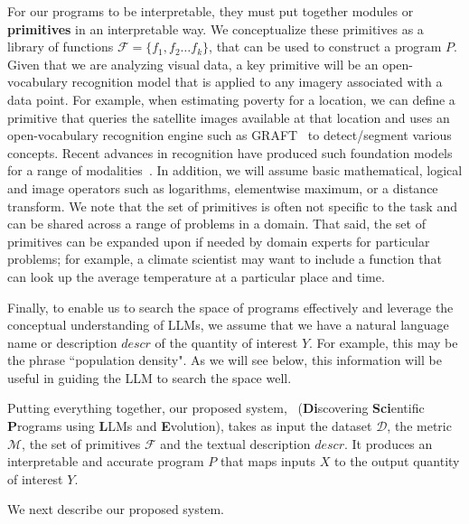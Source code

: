 For our programs to be interpretable, they must put together modules or \textbf{primitives} in an interpretable way.
We conceptualize these primitives as a library of functions $\mathcal{F} = \{f_1, f_2 \dots f_k\}$, that can be used to construct a program $P$.
Given that we are analyzing visual data, a key primitive will be an open-vocabulary recognition model that is applied to any imagery associated with a data point.
For example, when estimating poverty for a location, we can define a primitive that 
queries the satellite images available at that location and uses an open-vocabulary recognition engine such as GRAFT~\cite{mall2023graft} to detect/segment various concepts.
Recent advances in recognition have produced such foundation models for a range of modalities~\cite{mall2023graft, stevens2024bioclip}. 
In addition, we will assume basic mathematical, logical and image operators such as
logarithms, elementwise maximum, or a distance transform.
We note that the set of primitives is often not specific to the task and can be shared across a range of problems in a domain.
That said, the set of primitives can be expanded upon if needed by domain experts for particular problems; for example, a climate scientist may want to include a function that can look up the average temperature at a particular place and time.


Finally, to enable us to search the space of programs effectively and leverage the conceptual understanding of LLMs, we assume that we have a natural language name or description $descr$ of the quantity of interest $Y$. For example, this may be the phrase ``population density". 
As we will see below, this information will be useful in guiding the LLM to search the space well.

Putting everything together, our proposed system, \disciple~(\textbf{Di}scovering \textbf{Sci}entific \textbf{P}rograms  using \textbf{L}LMs
and \textbf{E}volution), takes as input the dataset $\mathcal{D}$, the metric $\mathcal{M}$, the set of primitives $\mathcal{F}$ and the textual description $descr$. It produces an interpretable and accurate program $P$ that maps inputs $X$ to the output quantity of interest $Y$.

We next describe our proposed system.








